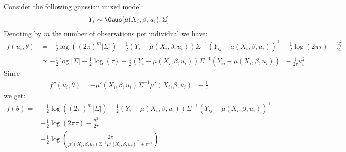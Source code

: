 \documentclass[12pt]{article}
\newcommand\trans[1]{{#1}^\intercal}%
\begin{document}
Consider the following gaussian mixed model:
\begin{align*}
Y_{i} \sim \Gaus[\mu(X_{i}, \beta,u_i),\Sigma]
\end{align*}
Denoting by \(m\) the number of observations per individual we have:
\begin{align*}
f(u_i,\theta) &= - \frac{1}{2} \log\left((2\pi)^m |\Sigma|\right) - \frac{1}{2} (Y_{i}-\mu(X_{i},\beta,u_i)) \Sigma^{-1} \trans{(Y_{ij}-\mu(X_{i},\beta,u_i))}
- \frac{1}{2} \log(2\pi \tau) -\frac{u_i^2}{2\tau} \\
&\propto  - \frac{1}{2} \log|\Sigma| - \frac{1}{2} \log(\tau) 
- \frac{1}{2} (Y_{i}-\mu(X_{i},\beta,u_i)) \Sigma^{-1} \trans{(Y_{ij}-\mu(X_{i},\beta,u_i))}
- \frac{1}{2\tau} u_i^2 
\end{align*}
Since 
\begin{align*}
f''(u_i,\theta) = - \mu'(X_{i},\beta,u_i) \Sigma^{-1} \trans{\mu'(X_{i},\beta,u_i)} - \frac{1}{\tau}
\end{align*}
we get:
\begin{align*}
f(\theta) =
& - \frac{1}{2} \log\left((2\pi)^m |\Sigma|\right) - \frac{1}{2} (Y_{i}-\mu(X_{i},\beta,u_i)) \Sigma^{-1} \trans{(Y_{ij}-\mu(X_{i},\beta,u_i))} \\
& - \frac{1}{2} \log(2\pi \tau) -\frac{u_i^2}{2\tau} \\
& + \frac{1}{2} \log\left(\frac{2 \pi}{\mu'(X_{i},\beta,u_i) \Sigma^{-1} \trans{\mu'(X_{i},\beta,u_i)} + \tau^{-1}}\right) 
\end{align*}
\end{document}
